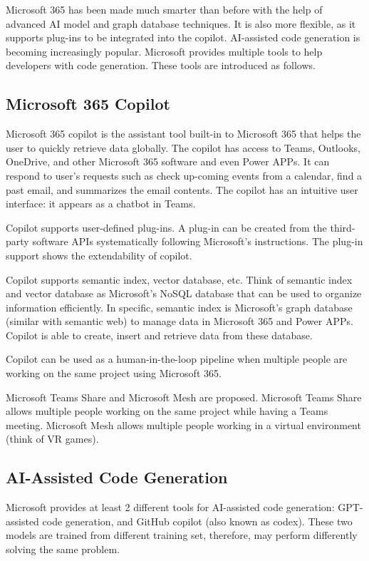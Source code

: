 Microsoft 365 has been made much smarter than before with the help of advanced AI model and graph database techniques. It is also more flexible, as it supports plug-ins to be integrated into the copilot. AI-assisted code generation is becoming increasingly popular. Microsoft provides multiple tools to help developers with code generation. These tools are introduced as follows.

\subsection{Microsoft 365 Copilot}

Microsoft 365 copilot is the assistant tool built-in to Microsoft 365 that helps the user to quickly retrieve data globally. The copilot has access to Teams, Outlooks, OneDrive, and other Microsoft 365 software and even Power APPs. It can respond to user's requests such as check up-coming events from a calendar, find a past email, and summarizes the email contents. The copilot has an intuitive user interface: it appears as a chatbot in Teams.

Copilot supports user-defined plug-ins. A plug-in can be created from the third-party software APIs systematically following Microsoft's instructions. The plug-in support shows the extendability of copilot.

Copilot supports semantic index, vector database, etc. Think of semantic index and vector database as Microsoft's NoSQL database that can be used to organize information efficiently. In specific, semantic index is Microsoft's graph database (similar with semantic web) to manage data in Microsoft 365 and Power APPs. Copilot is able to create, insert and retrieve data from these database.

Copilot can be used as a human-in-the-loop pipeline when multiple people are working on the same project using Microsoft 365.

Microsoft Teams Share and Microsoft Mesh are proposed. Microsoft Teams Share allows multiple people working on the same project while having a Teams meeting. Microsoft Mesh allows multiple people working in a virtual environment (think of VR games).

\subsection{AI-Assisted Code Generation}

Microsoft provides at least 2 different tools for AI-assisted code generation: GPT-assisted code generation, and GitHub copilot (also known as codex). These two models are trained from different training set, therefore, may perform differently solving the same problem.

